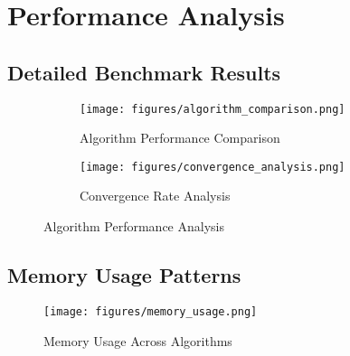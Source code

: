 \documentclass[11pt,a4paper]{article}
\begin{document}
\section{Performance Analysis}

\subsection{Detailed Benchmark Results}

\begin{figure}[H]
\centering
\begin{subfigure}{0.45\textwidth}
    \texttt{[image: figures/algorithm\_comparison.png]}
    \caption{Algorithm Performance Comparison}
    \label{fig:alg_comparison}
\end{subfigure}
\hfill
\begin{subfigure}{0.45\textwidth}
    \texttt{[image: figures/convergence\_analysis.png]}
    \caption{Convergence Rate Analysis}
    \label{fig:convergence}
\end{subfigure}
\caption{Algorithm Performance Analysis}
\label{fig:performance_analysis}
\end{figure}

\subsection{Memory Usage Patterns}

\begin{figure}[H]
\centering
\texttt{[image: figures/memory\_usage.png]}
\caption{Memory Usage Across Algorithms}
\label{fig:memory_usage}
\end{figure}
\end{document}
